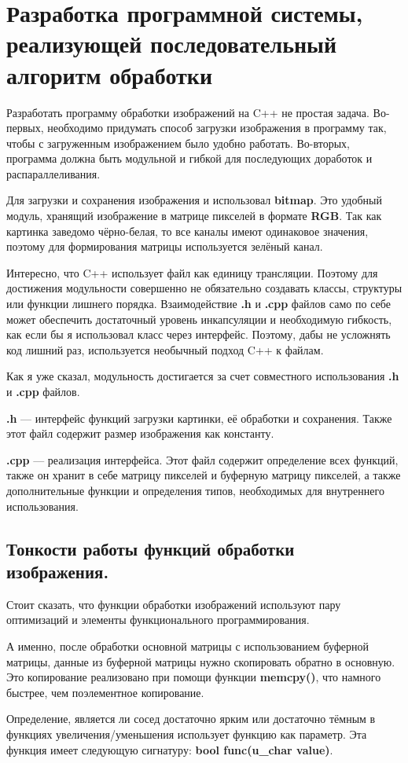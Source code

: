 \section{Разработка программной системы, реализующей последовательный алгоритм обработки}\label{sec:devprog}
Разработать программу обработки изображений на C++ не простая задача.
Во-первых, необходимо придумать способ загрузки изображения в программу так, чтобы с загруженным изображением было удобно работать.
Во-вторых, программа должна быть модульной и гибкой для последующих доработок и распараллеливания.

Для загрузки и сохранения изображения и использовал \textbf{bitmap}.
Это удобный модуль, хранящий изображение в матрице пикселей в формате \textbf{RGB}.
Так как картинка заведомо чёрно-белая, то все каналы имеют одинаковое значения, поэтому для формирования матрицы используется зелёный канал.

Интересно, что C++ использует файл как единицу трансляции.
Поэтому для достижения модульности совершенно не обязательно создавать классы, структуры или функции лишнего порядка.
Взаимодействие \textbf{.h} и \textbf{.cpp} файлов само по себе может обеспечить достаточный уровень инкапсуляции и необходимую гибкость, как если бы я использовал класс через интерфейс.
Поэтому, дабы не усложнять код лишний раз, используется необычный подход C++ к файлам.

Как я уже сказал, модульность достигается за счет совместного использования \textbf{.h} и \textbf{.cpp} файлов.

\textbf{.h} --- интерфейс функций загрузки картинки, её обработки и сохранения.
Также этот файл содержит размер изображения как константу.

\textbf{.cpp} --- реализация интерфейса.
Этот файл содержит определение всех функций, также он хранит в себе матрицу пикселей и буферную матрицу пикселей, а также дополнительные функции и определения типов, необходимых для внутреннего использования.

\subsection{Тонкости работы функций обработки изображения.}\label{subsec:imageprocessingPickUpOn}
Стоит сказать, что функции обработки изображений используют пару оптимизаций и элементы функционального программирования.

А именно, после обработки основной матрицы с использованием буферной матрицы, данные из буферной матрицы нужно скопировать обратно в основную.
Это копирование реализовано при помощи функции \textbf{memcpy()}, что намного быстрее, чем поэлементное копирование.

Определение, является ли сосед достаточно ярким или достаточно тёмным в функциях увеличения/уменьшения использует функцию как параметр.
Эта функция имеет следующую сигнатуру: \textbf{bool func(u\_char value)}.
